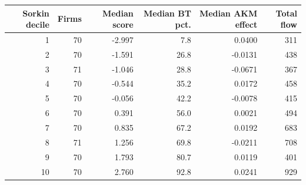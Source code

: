 \begin{tabular}{@{}rrrrrr@{}}
\toprule
Sorkin decile & Firms & Median score & Median BT pct. & Median AKM effect & Total flow \\
\midrule
1 & 70 & -2.997 & 7.8 & 0.0400 & 311 \\
2 & 70 & -1.591 & 26.8 & -0.0131 & 438 \\
3 & 71 & -1.046 & 28.8 & -0.0671 & 367 \\
4 & 70 & -0.544 & 35.2 & 0.0172 & 458 \\
5 & 70 & -0.056 & 42.2 & -0.0078 & 415 \\
6 & 70 & 0.391 & 56.0 & 0.0021 & 494 \\
7 & 70 & 0.835 & 67.2 & 0.0192 & 683 \\
8 & 71 & 1.256 & 69.8 & -0.0211 & 708 \\
9 & 70 & 1.793 & 80.7 & 0.0119 & 401 \\
10 & 70 & 2.760 & 92.8 & 0.0241 & 929 \\
\bottomrule
\end{tabular}
